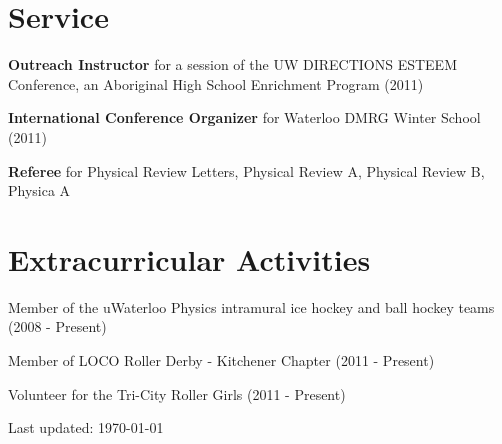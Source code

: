 \documentclass[letterpaper]{article}
\def\footerlink{http://jblevins.org/projects/cv-template/}
\renewenvironment{itemize}{
  \begin{list}{}{
    \setlength{\leftmargin}{1.5em}
  }
}{
  \end{list}
}
\begin{document}
\section*{Service}

\begin{itemize}

\item {\bf Outreach Instructor} for a session of the UW DIRECTIONS ESTEEM Conference, an Aboriginal High School Enrichment Program (2011)

\item {\bf International Conference Organizer} for Waterloo DMRG Winter School (2011)

\item {\bf Referee} for Physical Review Letters, Physical Review A, Physical Review B, Physica A
\end{itemize}

\section*{Extracurricular Activities}

\begin{itemize}

\item Member of the uWaterloo Physics intramural ice hockey and ball hockey teams (2008 - Present)

\item Member of LOCO Roller Derby - Kitchener Chapter (2011 - Present)

\item Volunteer for the Tri-City Roller Girls (2011 - Present)
\end{itemize}

\bigskip

\begin{center}
  \begin{footnotesize}
    Last updated: \today \\
  \end{footnotesize}
\end{center}
\end{document}
